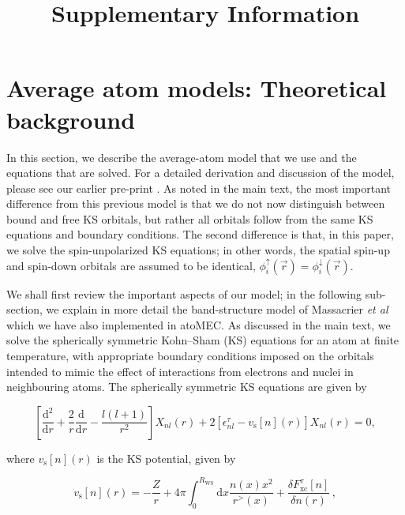 \documentclass[9pt]{article}
\title{Supplementary Information}
\begin{document}
    
    \maketitle
    
    

    
    \hypertarget{average-atom-models-theoretical-background}{%
\section{Average atom models: Theoretical
background}\label{average-atom-models-theoretical-background}}

In this section, we describe the average-atom model that we use and the
equations that are solved. For a detailed derivation and discussion of
the model, please see our earlier pre-print
\cite{callow2021firstprinciples}. As noted in the main text, the most
important difference from this previous model is that we do not now
distinguish between bound and free KS orbitals, but rather all orbitals
follow from the same KS equations and boundary conditions. The second
difference is that, in this paper, we solve the spin-unpolarized KS
equations; in other words, the spatial spin-up and spin-down orbitals
are assumed to be identical,
\(\phi_i^\uparrow(\vec{r})=\phi_i^\downarrow(\vec{r})\).

We shall first review the important aspects of our model; in the
following sub-section, we explain in more detail the band-structure
model of Massacrier \emph{et al} \cite{massacrier_band} which we have
also implemented in atoMEC. As discussed in the main text, we solve the
spherically symmetric Kohn--Sham (KS) equations for an atom at finite
temperature, with appropriate boundary conditions imposed on the
orbitals intended to mimic the effect of interactions from electrons and
nuclei in neighbouring atoms. The spherically symmetric KS equations are
given by

\begin{equation}
\left[\frac{\textrm{d}^2}{\textrm{d}r} + \frac{2}{r}\frac{\textrm{d}}{\textrm{d}r} - \frac{l(l+1)}{r^2} \right] X_{nl}(r) + 2 \left[\epsilon^{\tau}_{nl} - v_\textrm{s}[n](r) \right] X_{nl}(r) = 0,
\end{equation}

where \(v_\textrm{s}[n](r)\) is the KS potential, given by

\begin{equation}
 v_{\textrm{s}}[n](r) = -\frac{Z}{r} + 4\pi \int_0^{R_\textrm{WS}} \textrm{d}{x} \frac{n(x)x^2}{r^>(x)} + \frac{\delta F_\textrm{xc}^\tau [n]}{\delta n(r)}\,,
\end{equation}
\end{document}
